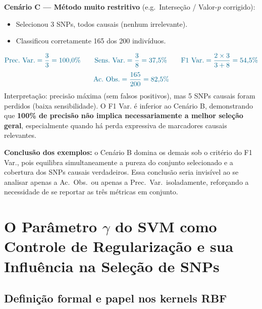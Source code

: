\documentclass[12pt,a4paper]{article}
\newcommand{\novo}[1]{\textcolor{corNova}{#1}}
\begin{document}
\medskip
\noindent\novo{\textbf{Cenário C --- Método muito restritivo} (e.g.\ Interseção / Valor-$p$ corrigido):}
\begin{itemize}
  \item \novo{Selecionou 3 SNPs, todos causais (nenhum irrelevante).}
  \item \novo{Classificou corretamente 165 dos 200 indivíduos.}
\end{itemize}
\[
  \novo{\text{Prec.\ Var.} = \frac{3}{3} = 100{,}0\% \qquad
   \text{Sens.\ Var.} = \frac{3}{8} = 37{,}5\% \qquad
   \text{F1\ Var.} = \frac{2\times3}{3+8} = 54{,}5\%}
\]
\[
  \novo{\text{Ac.\ Obs.} = \frac{165}{200} = 82{,}5\%}
\]
\novo{Interpretação: precisão máxima (sem falsos positivos), mas 5 SNPs causais foram perdidos (baixa sensibilidade). O F1 Var. é inferior ao Cenário B, demonstrando que \textbf{100\% de precisão não implica necessariamente a melhor seleção geral}, especialmente quando há perda expressiva de marcadores causais relevantes.}

\medskip
\novo{\textbf{Conclusão dos exemplos:} o Cenário B domina os demais sob o critério do F1 Var., pois equilibra simultaneamente a pureza do conjunto selecionado e a cobertura dos SNPs causais verdadeiros. Essa conclusão seria invisível ao se analisar apenas a Ac.\ Obs.\ ou apenas a Prec.\ Var.\ isoladamente, reforçando a necessidade de se reportar as três métricas em conjunto.}

\section*{\novo{O Parâmetro $\gamma$ do SVM como Controle de Regularização e sua Influência na Seleção de SNPs}}

\novo{\subsection*{Definição formal e papel nos kernels RBF}}
\end{document}
